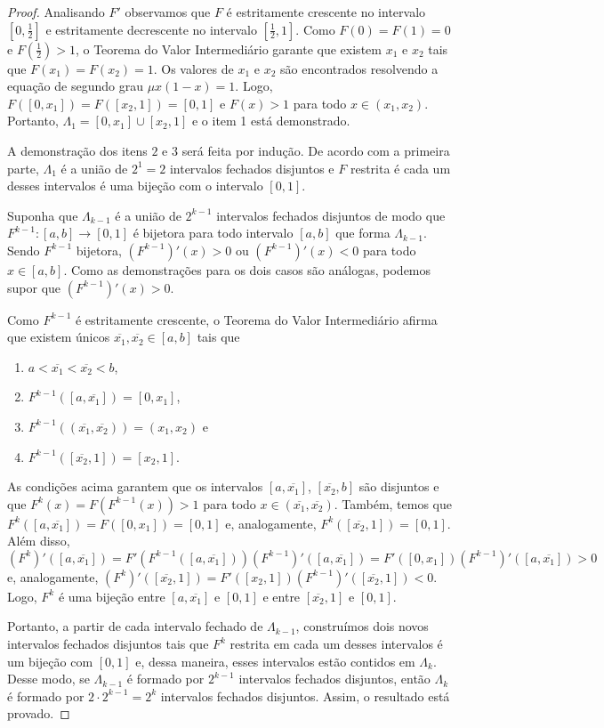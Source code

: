 \documentclass[a4paper, 12pt]{article}
\theoremstyle{definition}
\theoremstyle{plain}
\theoremstyle{plain}
\theoremstyle{plain}
\theoremstyle{definition}
\theoremstyle{remark}
\begin{document}
\begin{proof}
Analisando $F'$ observamos que $F$ é estritamente crescente no intervalo $[0, \frac{1}{2}]$ e estritamente decrescente no intervalo $[\frac{1}{2}, 1]$. Como $F(0) = F(1) = 0$ e $F(\frac{1}{2}) > 1$, o Teorema do Valor Intermediário garante que existem $x_1$ e $x_2$ tais que $F(x_1) = F(x_2) = 1$. Os valores de $x_1$ e $x_2$ são encontrados resolvendo a equação de segundo grau $\mu x(1-x) = 1$. Logo, $F([0, x_1]) = F([x_2, 1]) = [0, 1]$ e $F(x) > 1$ para todo $x \in (x_1, x_2)$. Portanto, $\Lambda_1 = [0, x_1] \cup [x_2, 1]$ e o item 1 está demonstrado.

A demonstração dos itens $2$ e $3$ será feita por indução. De acordo com a primeira parte, $\Lambda_1$ é a união de $2^1 = 2$ intervalos fechados disjuntos e $F$ restrita é cada um desses intervalos é uma bijeção com o intervalo $[0,1]$.

Suponha que $\Lambda_{k-1}$ é a união de $2^{k-1}$ intervalos fechados disjuntos de modo que $F^{k-1}: [a, b] \to [0, 1]$ é bijetora para todo intervalo $[a, b]$ que forma $\Lambda_{k-1}$. Sendo $F^{k-1}$ bijetora, $(F^{k-1})'(x) > 0$ ou $(F^{k-1})'(x) < 0$ para todo $x \in [a, b]$. Como as demonstrações para os dois casos são análogas, podemos supor que $(F^{k-1})'(x) > 0$.

Como $F^{k-1}$ é estritamente crescente, o Teorema do Valor Intermediário afirma que existem únicos $\overline{x_1}, \overline{x_2} \in [a, b]$ tais que
\begin{enumerate}[label=(\alph*)]
\item$a < \overline{x_1} < \overline{x_2} < b$,
\item$F^{k-1}([a, \overline{x_1}]) = [0, x_1]$,
\item$F^{k-1}((\overline{x_1}, \overline{x_2})) = (x_1, x_2)$ e
\item$F^{k-1}([\overline{x_2}, 1]) = [x_2, 1]$.
\end{enumerate}

As condições acima garantem que os intervalos $[a, \overline{x_1}]$, $[\overline{x_2}, b]$ são disjuntos e que $F^k(x) = F(F^{k-1}(x)) > 1$ para todo $x \in (\overline{x_1}, \overline{x_2})$. Também, temos que $F^k([a, \overline{x_1}]) = F([0, x_1]) = [0, 1]$ e, analogamente, $F^k([\overline{x_2}, 1]) = [0, 1]$. Além disso, $(F^k)'([a, \overline{x_1}]) = F'(F^{k-1}([a, \overline{x_1}]))(F^{k-1})'([a, \overline{x_1}]) = F'([0, x_1])(F^{k-1})'([a, \overline{x_1}]) > 0$ e, analogamente, $(F^k)'([\overline{x_2}, 1]) = F'([x_2, 1])(F^{k-1})'([\overline{x_2}, 1]) < 0$. Logo, $F^k$ é uma bijeção entre $[a, \overline{x_1}]$ e $[0, 1]$ e entre $[\overline{x_2}, 1]$ e $[0, 1]$.

Portanto, a partir de cada intervalo fechado de $\Lambda_{k-1}$, construímos dois novos intervalos fechados disjuntos tais que $F^k$ restrita em cada um desses intervalos é um bijeção com $[0, 1]$ e, dessa maneira, esses intervalos estão contidos em $\Lambda_k$. Desse modo, se $\Lambda_{k-1}$ é formado por $2^{k-1}$ intervalos fechados disjuntos, então $\Lambda_k$ é formado por $2 \cdot 2^{k-1} = 2^k$ intervalos fechados disjuntos. Assim, o resultado está provado.
\end{proof}
\end{document}
